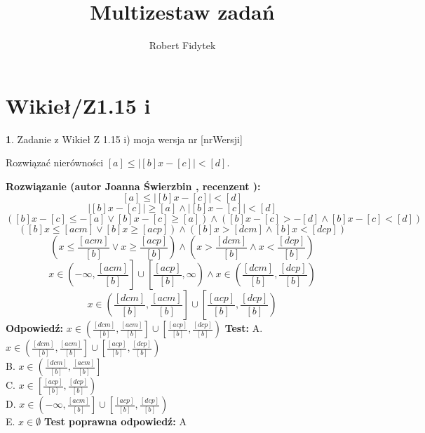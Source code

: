 \documentclass[12pt, a4paper]{article}
\title{Multizestaw zadań}
\author{Robert Fidytek}
\date{}
\theoremstyle{definition} %
\newtheorem{zad}{}
\newcommand{\kategoria}[1]{\section{#1}} %
\newcommand{\zadStart}[1]{\begin{zad}#1\newline} %
\newcommand{\zadStop}{\end{zad}}   %
\newcommand{\rozwStart}[2]{\noindent \textbf{Rozwiązanie (autor #1 , recenzent #2): }\newline} %
\newcommand{\rozwStop}{\newline}                                            %
\newcommand{\odpStart}{\noindent \textbf{Odpowiedź:}\newline}    %
\newcommand{\odpStop}{\newline}                                             %
\newcommand{\testStart}{\noindent \textbf{Test:}\newline} %
\newcommand{\testStop}{\newline} %
\newcommand{\kluczStart}{\noindent \textbf{Test poprawna odpowiedź:}\newline} %
\newcommand{\kluczStop}{\newline} %
\begin{document}
\maketitle


\kategoria{Wikieł/Z1.15 i}
\zadStart{Zadanie z Wikieł Z 1.15 i) moja wersja nr [nrWersji]}


Rozwiązać nierówności  $[a] \leq |{[b]x-[c]}| < [d]$.
\zadStop
\rozwStart{Joanna Świerzbin}{}
$$[a] \leq |{[b]x-[c]}| < [d]$$
$$ |{[b]x-[c]}| \geq [a] \land |{[b]x-[c]}| < [d]$$
$$ ( {[b]x-[c]} \leq -[a] \vee {[b]x-[c]} \geq [a] ) \land ( {[b]x-[c]} > -[d] \land {[b]x-[c]} < [d] )$$
$$ ( {[b]x} \leq [acm] \vee {[b]x} \geq [acp] ) \land ( {[b]x} > [dcm] \land {[b]x} < [dcp] )$$
$$ \left( {x} \leq \frac{[acm]}{[b]} \vee {x} \geq \frac{[acp]}{[b]} \right) \land \left( {x} > \frac{[dcm]}{[b]} \land {x} < \frac{[dcp]}{[b]} \right)$$
$$ x \in \left( -\infty, \frac{[acm]}{[b]} \right] \cup \left[ \frac{[acp]}{[b]}, \infty \right) \land x \in \left( \frac{[dcm]}{[b]} ,\frac{[dcp]}{[b]} \right)$$
$$ x \in \left( \frac{[dcm]}{[b]}, \frac{[acm]}{[b]} \right] \cup \left[ \frac{[acp]}{[b]}, \frac{[dcp]}{[b]} \right)$$
\rozwStop
\odpStart
$ x \in \left( \frac{[dcm]}{[b]}, \frac{[acm]}{[b]} \right] \cup \left[ \frac{[acp]}{[b]}, \frac{[dcp]}{[b]} \right)$
\odpStop
\testStart
A. $ x \in \left( \frac{[dcm]}{[b]}, \frac{[acm]}{[b]} \right] \cup \left[ \frac{[acp]}{[b]}, \frac{[dcp]}{[b]} \right)$\\
B. $ x \in \left( \frac{[dcm]}{[b]}, \frac{[acm]}{[b]} \right] $\\
C. $ x \in  \left[ \frac{[acp]}{[b]}, \frac{[dcp]}{[b]} \right)$\\
D. $ x \in \left( -\infty, \frac{[acm]}{[b]} \right] \cup \left[ \frac{[acp]}{[b]}, \frac{[dcp]}{[b]} \right)$\\
E. $ x \in \emptyset $
\testStop
\kluczStart
A
\kluczStop
\end{document}

